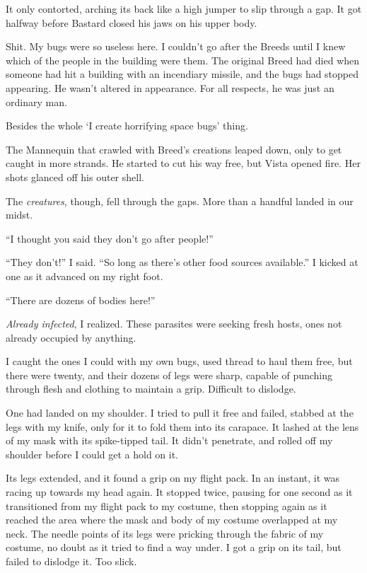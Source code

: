It only contorted, arching its back like a high jumper to slip through a gap.  It got halfway before Bastard closed his jaws on his upper body.



Shit.  My bugs were so useless here.  I couldn't go after the Breeds until I knew which of the people in the building were them.  The original Breed had died when someone had hit a building with an incendiary missile, and the bugs had stopped appearing.  He wasn't altered in appearance.  For all respects, he was just an ordinary man.



Besides the whole `I create horrifying space bugs' thing.



The Mannequin that crawled with Breed's creations leaped down, only to get caught in more strands.  He started to cut his way free, but Vista opened fire.  Her shots glanced off his outer shell.



The \emph{creatures}, though, fell through the gaps.  More than a handful landed in our midst.



``I thought you said they don't go after people!''



``They don't!'' I said.  ``So long as there's other food sources available.''  I kicked at one as it advanced on my right foot.



``There are dozens of bodies here!''



\emph{Already infected}, I realized.  These parasites were seeking fresh hosts, ones not already occupied by anything.



I caught the ones I could with my own bugs, used thread to haul them free, but there were twenty, and their dozens of legs were sharp, capable of punching through flesh and clothing to maintain a grip.  Difficult to dislodge.



One had landed on my shoulder.  I tried to pull it free and failed, stabbed at the legs with my knife, only for it to fold them into its carapace.  It lashed at the lens of my mask with its spike-tipped tail.  It didn't penetrate, and rolled off my shoulder before I could get a hold on it.



Its legs extended, and it found a grip on my flight pack.  In an instant, it was racing up towards my head again.  It stopped twice, pausing for one second as it transitioned from my flight pack to my costume, then stopping again as it reached the area where the mask and body of my costume overlapped at my neck.  The needle points of its legs were pricking through the fabric of my costume, no doubt as it tried to find a way under.  I got a grip on its tail, but failed to dislodge it.  Too slick.



